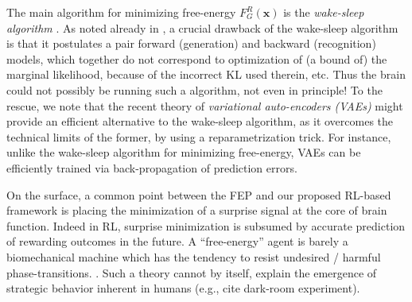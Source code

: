 \documentclass[10pt,letterpaper]{article}
\def\x{\mathbf{x}}
\begin{document}
The main algorithm for minimizing free-energy $F_G^R(\x)$ is the \textit{wake-sleep algorithm}
\citep{dayan1995helmholtz}. As noted already in \citep{dayan1995helmholtz},
a crucial drawback of the wake-sleep algorithm is that it postulates a pair forward (generation) and backward (recognition) models,
which together do not correspond to optimization of (a bound of) the marginal likelihood, because of the incorrect KL used therein, etc.
Thus the brain could not possibly be running such a algorithm, not even in principle! To the rescue, we note that the recent theory of
\textit{variational auto-encoders (VAEs)} \citep{kingma2013auto} might provide an efficient alternative to the wake-sleep algorithm,
as it overcomes the technical limits of the former, by using a reparametrization trick. For instance, unlike the wake-sleep algorithm
for minimizing free-energy, VAEs can be efficiently trained via back-propagation of prediction errors.

On the surface, a common point between the FEP and our proposed RL-based framework
  is placing the minimization of a surprise signal at the core of brain function.
  Indeed in RL, surprise minimization is subsumed  by accurate prediction of
  rewarding outcomes in the future. A ``free-energy'' agent is barely a biomechanical machine which has the tendency to resist undesired / harmful phase-transitions.
  \citep{friston2010free,fristonAIorRL,ortega2013thermodynamics}. Such a theory cannot by itself,
  explain the emergence of strategic behavior inherent in humans (e.g.,  cite dark-room experiment).

\end{document}
